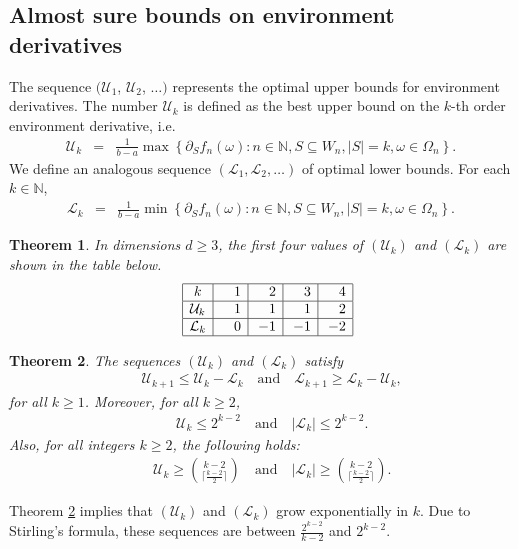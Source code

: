 \documentclass[reqno]{amsart}
\newtheorem{theorem}{Theorem}[section]
\begin{document}
\subsection{Almost sure bounds on environment derivatives}
The sequence $(\mathcal U_1$, $\mathcal U_2$, $\dots)$ represents the optimal upper bounds for environment derivatives. The number $\mathcal U_k$ is defined as the best upper bound on the $k$-th order environment derivative, i.e. 
\begin{eqnarray}
\mathcal U_k&=&\frac1{b-a} \max\left\{\partial_Sf_n(\omega):n\in\mathbb N, S\subseteq W_n, |S|=k, \omega\in \Omega_n\right\}. \label{eqn|DefinitionUn}
\end{eqnarray}
We define an analogous sequence $(\mathcal L_1, \mathcal L_2, \dots)$ 
of optimal lower bounds. For each $k\in\mathbb N$, 
\begin{eqnarray}
\mathcal L_k&=&\frac1{b-a} \min\left\{\partial_Sf_n(\omega):n\in\mathbb N, S\subseteq W_n, |S|=k, \omega\in \Omega_n\right\}. \label{eqn|DefinitionLn}
\end{eqnarray}
 \begin{theorem}\label{thm|firstFew} 
In dimensions $d \geq 3$, the first four values of $(\mathcal{U}_k)$ and $(\mathcal{L}_k)$ are shown in the table below.
\begin{eqnarray}&&
\begin{array}{|c|r|r|r|r|}
\hline 
k&{\quad}1&{\quad}2&{\quad}3&{\quad}4\\
\hline
\mathcal U_k&1&1&1&2\\
\hline 
\mathcal L_k&0&-1&-1&-2\\
\hline
\end{array}
\label{eqn|firstFew}
\end{eqnarray}
\end{theorem}
\begin{theorem}\label{thm|generalUpperBounds}
The sequences $(\mathcal U_k)$ and $(\mathcal L_k)$ satisfy 
\begin{eqnarray} 
&& \mathcal U_{k+1}\leq \mathcal U_k -\mathcal L_k\quad\mbox{and}\quad \mathcal L_{k+1}\geq \mathcal L_k-\mathcal U_k, \label{eqn|gBoundFibonacci}\end{eqnarray} for all $k\geq 1$. Moreover, for all $k\geq 2$,
\begin{eqnarray}
&& \mathcal U_k \leq 2^{k-2}\quad\mbox{and}\quad \left|\mathcal L_k\right| \leq 2^{k-2}. \label{eqn|uBoundsUL}\end{eqnarray}
Also, for all integers $k \geq 2$, the following holds:
\begin{eqnarray}&& \mathcal U_k \geq \binom{k-2}{\lceil\frac{k-2}2\rceil} \quad\mbox{and}\quad \left|\mathcal L_k\right| \geq \binom{k-2}{\lceil\frac{k-2}2\rceil}.\label{eqn|lBoundsUL}
\end{eqnarray}
\end{theorem}
Theorem \ref{thm|generalUpperBounds} implies that $(\mathcal U_k)$ and $(\mathcal L_k)$ grow exponentially in $k$. Due to Stirling's formula, these sequences are between $\frac{2^{k-2}}{k-2}$ and $2^{k-2}$. 
\end{document}
